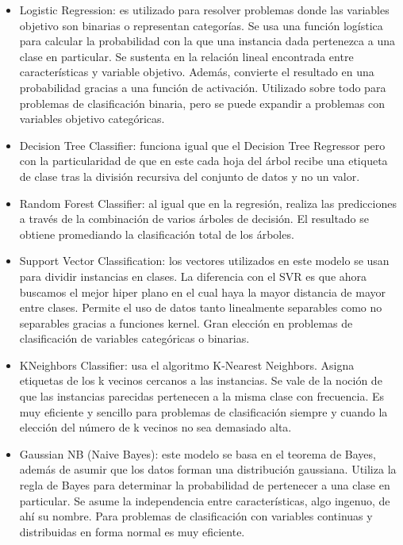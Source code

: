 \begin{itemize}
    \item Logistic Regression: es utilizado para resolver problemas donde las variables objetivo son binarias o representan categorías. Se usa una función logística para calcular la probabilidad con la que una instancia dada pertenezca a una clase en particular. Se sustenta en la relación lineal encontrada entre características y variable objetivo. Además, convierte el resultado en una probabilidad gracias a una función de activación. Utilizado sobre todo para problemas de clasificación binaria, pero se puede expandir a problemas con variables objetivo categóricas.
    \item Decision Tree Classifier: funciona igual que el Decision Tree Regressor pero con la particularidad de que en este cada hoja del árbol recibe una etiqueta de clase tras la división recursiva del conjunto de datos y no un valor.
    \item Random Forest Classifier: al igual que en la regresión, realiza las predicciones a través de la combinación de varios árboles de decisión. El resultado se obtiene promediando la clasificación total de los árboles.
    \item Support Vector Classification: los vectores utilizados en este modelo se usan para dividir instancias en clases. La diferencia con el SVR es que ahora buscamos el mejor hiper plano en el cual haya la mayor distancia de mayor entre clases. Permite el uso de datos tanto linealmente separables como no separables gracias a funciones kernel. Gran elección en problemas de clasificación de variables categóricas o binarias.
    \item KNeighbors Classifier: usa el algoritmo K-Nearest Neighbors. Asigna etiquetas de los k vecinos cercanos a las instancias. Se vale de la noción de que las instancias parecidas pertenecen a la misma clase con frecuencia. Es muy eficiente y sencillo para problemas de clasificación siempre y cuando la elección del número de k vecinos no sea demasiado alta.
    \item Gaussian NB (Naive Bayes): este modelo se basa en el teorema de Bayes, además de asumir que los datos forman una distribución gaussiana. Utiliza la regla de Bayes para determinar la probabilidad de pertenecer a una clase en particular. Se asume la independencia entre características, algo ingenuo, de ahí su nombre. Para problemas de clasificación con variables continuas y distribuidas en forma normal es muy eficiente.
\end{itemize}

